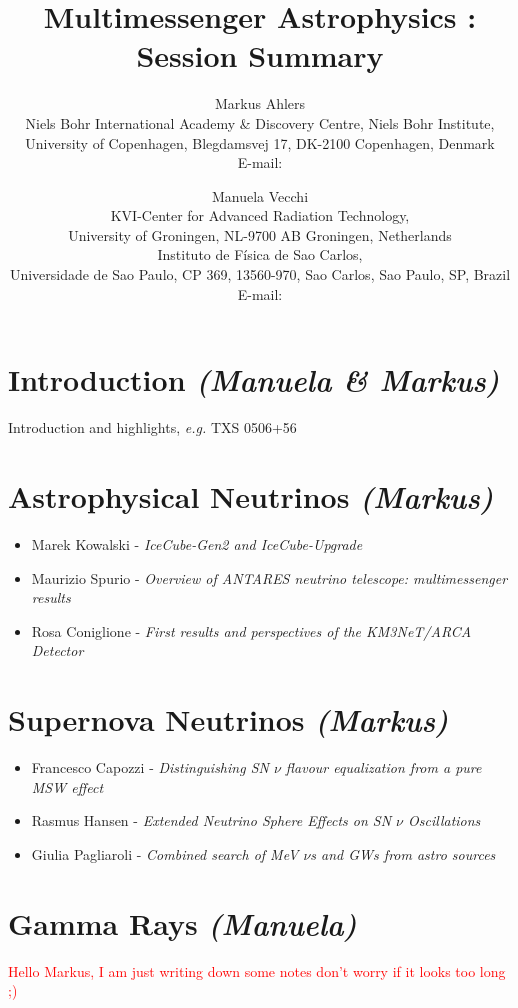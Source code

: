 \documentclass{PoS}
\title{Multimessenger Astrophysics : Session Summary}
\author{Markus Ahlers\\
        Niels Bohr International Academy \& Discovery Centre, Niels Bohr Institute,\\University of Copenhagen, Blegdamsvej 17, DK-2100 Copenhagen, Denmark\\
        E-mail: \email{markus.ahlers@nbi.ku.dk}}
\author{Manuela Vecchi\\
       KVI-Center for Advanced Radiation Technology,\\University of Groningen, NL-9700 AB Groningen, Netherlands\\Instituto de F\'isica de Sao Carlos,\\ Universidade de Sao Paulo, CP 369, 13560-970, Sao Carlos, Sao Paulo, SP, Brazil\\
        E-mail: \email{m.vecchi@rug.nl}}
\begin{document}
\section{Introduction {\it (Manuela \& Markus)}}

Introduction and highlights, {\it e.g.} TXS 0506+56~\cite{IceCube:2018cha,IceCube:2018dnn}

\section{Astrophysical Neutrinos {\it (Markus)}}

\begin{itemize}
\item Marek Kowalski - {\it IceCube-Gen2 and IceCube-Upgrade}~\cite{Aartsen:2014njl}
\item Maurizio Spurio - {\it Overview of ANTARES neutrino telescope: multimessenger results }
\item Rosa Coniglione - {\it First results and perspectives of the KM3NeT/ARCA Detector}~\cite{Adrian-Martinez:2016fdl}
\end{itemize}

\section{Supernova Neutrinos {\it (Markus)}}

\begin{itemize}
\item Francesco Capozzi - {\it Distinguishing SN $\nu$ flavour equalization from a pure MSW effect}
\item Rasmus Hansen - {\it Extended Neutrino Sphere Effects on SN $\nu$ Oscillations}
\item Giulia Pagliaroli - {\it Combined search of MeV $\nu$s and GWs from astro sources}
\end{itemize}

\section{Gamma Rays {\it (Manuela)}}
\textcolor{red}{Hello Markus, I am just writing down some notes  don't worry if it looks too long ;)}
\end{document}
